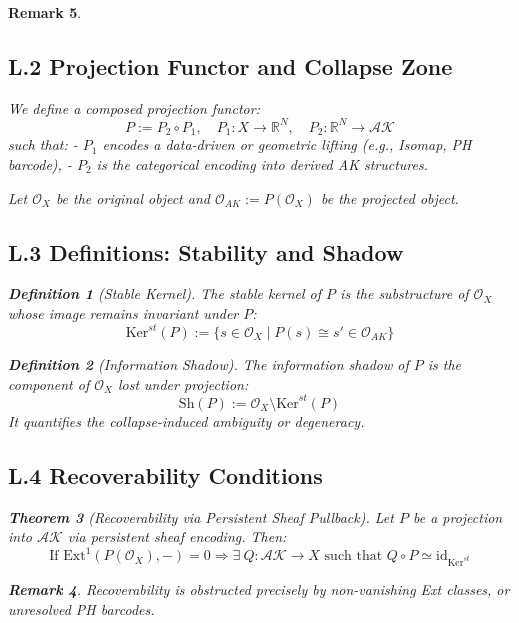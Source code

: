 \documentclass[11pt]{article}
\newtheorem{theorem}{Theorem}[section]
\newtheorem{definition}[theorem]{Definition}
\newtheorem{remark}[theorem]{Remark}
\begin{document}
\begin{remark}
\subsection*{L.2 Projection Functor and Collapse Zone}

We define a composed projection functor:
\[
P := P_2 \circ P_1,\quad P_1: X \to \mathbb{R}^N,\quad P_2: \mathbb{R}^N \to \mathcal{AK}
\]
such that:
- $P_1$ encodes a data-driven or geometric lifting (e.g., Isomap, PH barcode),
- $P_2$ is the categorical encoding into derived AK structures.

Let $\mathcal{O}_X$ be the original object and $\mathcal{O}_{AK} := P(\mathcal{O}_X)$ be the projected object.

\subsection*{L.3 Definitions: Stability and Shadow}

\begin{definition}[Stable Kernel]
The \emph{stable kernel} of $P$ is the substructure of $\mathcal{O}_X$ whose image remains invariant under $P$:
\[
\mathrm{Ker}^{st}(P) := \{ s \in \mathcal{O}_X \mid P(s) \cong s' \in \mathcal{O}_{AK} \}
\]
\end{definition}

\begin{definition}[Information Shadow]
The \emph{information shadow} of $P$ is the component of $\mathcal{O}_X$ lost under projection:
\[
\mathrm{Sh}(P) := \mathcal{O}_X \setminus \mathrm{Ker}^{st}(P)
\]
It quantifies the collapse-induced ambiguity or degeneracy.
\end{definition}

\subsection*{L.4 Recoverability Conditions}

\begin{theorem}[Recoverability via Persistent Sheaf Pullback]
Let $P$ be a projection into $\mathcal{AK}$ via persistent sheaf encoding. Then:
\[
\text{If } \mathrm{Ext}^1(P(\mathcal{O}_X), -) = 0 \Rightarrow \exists\ Q: \mathcal{AK} \to X \text{ such that } Q \circ P \simeq \mathrm{id}_{\mathrm{Ker}^{st}}
\]
\end{theorem}

\begin{remark}
Recoverability is obstructed precisely by non-vanishing Ext classes, or unresolved PH barcodes.
\end{remark}


\end{remark}
\end{document}
